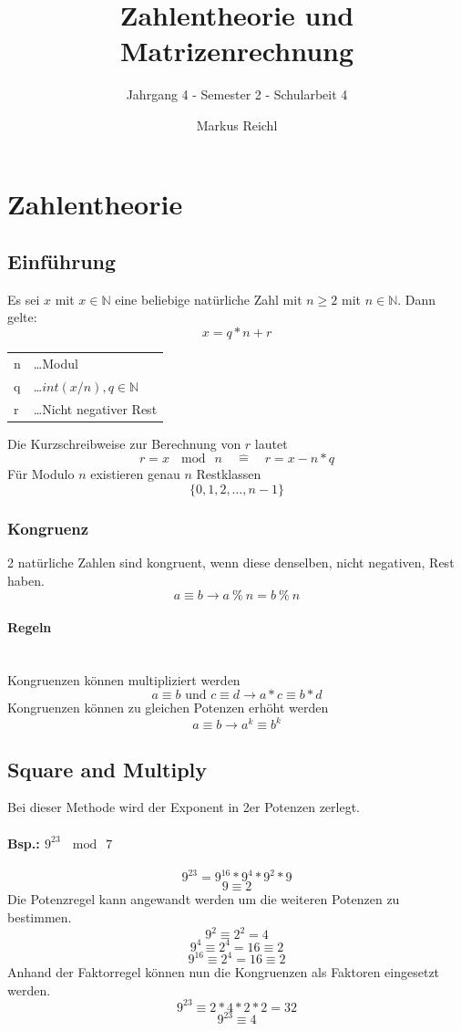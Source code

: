 \documentclass{school}
\title{Zahlentheorie und Matrizenrechnung}
\subtitle{Jahrgang 4 \-- Semester 2 \-- Schularbeit 4}
\author{Markus Reichl}
\begin{document}
\maketitle
\tableofcontents

\newpage
\section{Zahlentheorie}
\subsection{Einführung}
Es sei $x$ mit $x \in \mathbb{N}$ eine beliebige natürliche Zahl mit $n \ge 2$ mit $n \in \mathbb{N}$.
Dann gelte: $$x = q*n + r$$
\begin{center}
    \begin{tabular}{l l}
        n & \dots Modul \\
        q & \dots $int(x/n), q \in \mathbb{N}$\\
        r & \dots Nicht negativer Rest
    \end{tabular}
\end{center}
Die Kurzschreibweise zur Berechnung von $r$ lautet
$$r = x ~\mod~ n \quad \widehat{=} \quad r = x - n * q$$
Für Modulo $n$ existieren genau $n$ Restklassen
$$\{0, 1, 2, \ldots, n - 1\}$$

\subsubsection{Kongruenz}
2 natürliche Zahlen sind kongruent, wenn diese denselben, nicht negativen, Rest haben.
$$a \equiv b \to a ~\%~ n = b ~\%~ n$$

\paragraph{Regeln}~\\
Kongruenzen können multipliziert werden
$$a \equiv b \text{ und } c \equiv d \to a * c \equiv b * d$$
Kongruenzen können zu gleichen Potenzen erhöht werden
$$a \equiv b \to a^k \equiv b^k$$

\subsection{Square and Multiply}
Bei dieser Methode wird der Exponent in 2er Potenzen zerlegt.
\paragraph{Bsp.: $9^{23} ~\mod~ 7$}
$$9^{23} = 9^{16} * 9^{4} * 9^{2} * 9$$
$$9 \equiv 2$$
Die Potenzregel kann angewandt werden um die weiteren Potenzen zu bestimmen.
$$9^2 \equiv 2^2 = 4$$
$$9^4 \equiv 2^4 = 16 \equiv 2$$
$$9^{16} \equiv 2^4 = 16 \equiv 2$$
Anhand der Faktorregel können nun die Kongruenzen als Faktoren eingesetzt werden.
$$9^{23} \equiv 2 * 4 * 2 * 2 = 32$$
$$9^{23} \equiv 4$$
\end{document}
